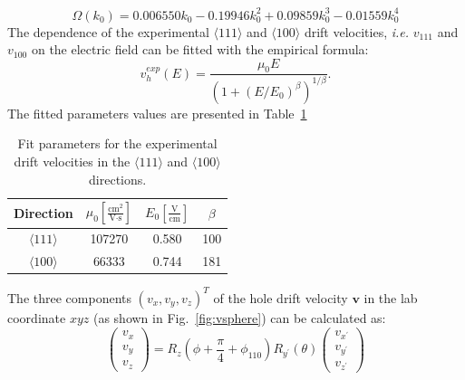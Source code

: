 \begin{equation}
  \label{eq:ome}
   \Omega(k_{0}) = 0.006550k_{0} - 0.19946k_{0}^{2} + 0.09859k_{0}^{3} - 0.01559k_{0}^{4}
\end{equation}
The dependence of the experimental $\langle111\rangle$ and $\langle100\rangle$ drift velocities, \textit{i.e.} $v_{111}$ and $v_{100}$ on the electric field can be fitted with the empirical formula: 
\begin{equation}
  \label{eq:exph}  
  v_{h}^{exp}(E) = \frac{\mu_{0}E}{(1+(E/E_{0})^{\beta})^{1/\beta}}.
\end{equation}
The fitted parameters values are presented in Table~\ref{tab:parh}
\begin{table}[tbhp]
  \centering
  \begin{tabular}{cccc}\hline\hline
    Direction & $\mu_{0} \left[ \frac{\mbox{cm}^{2}}{\mbox{V}\cdot\mbox{s}} \right]$ & $E_{0} \left[ \frac{\mbox{V}}{\mbox{cm}} \right]$ & $\beta$ \\\hline
$\langle111\rangle$ & 107270 & 0.580 & 100 \\
$\langle100\rangle$ & 66333 & 0.744 & 181 \\ \hline\hline
  \end{tabular}
  \caption{Fit parameters for the experimental drift velocities in the 
$\langle111\rangle$ and $\langle100\rangle$ directions.}
\label{tab:parh}
\end{table}

The three components $(v_{x}, v_{y}, v_{z})^{T}$ of the hole drift velocity $\mathbf{v}$ in the lab coordinate $xyz$ (as shown in Fig.~\ref{fig:vsphere}) can be calculated as:
\begin{equation}
  \label{eq:v2v}  
  \left(
    \begin{array}{c}
      v_{x} \\ v_{y} \\ v_{z}
    \end{array}
\right) = R_{z}(\phi + \frac{\pi}{4} + \phi_{110}) R_{y^{\prime}}(\theta) \left( 
    \begin{array}{c}
      v_{x^{\prime}} \\ v_{y^{\prime}} \\ v_{z^{\prime}}
    \end{array} \right)
\end{equation}

